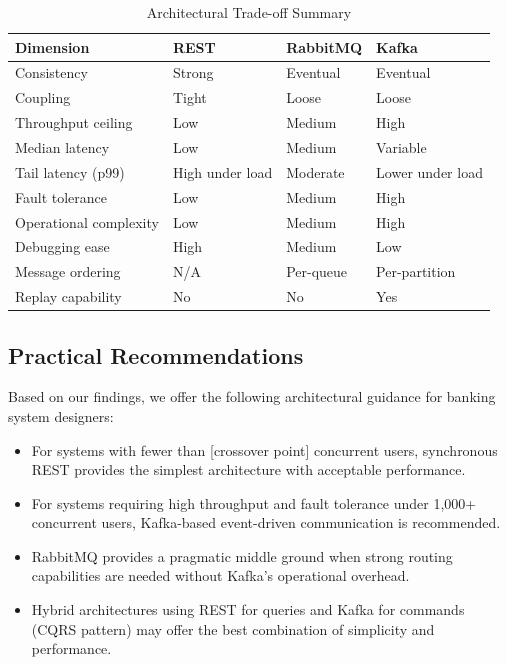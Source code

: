 \documentclass[journal]{IEEEtran}
\begin{document}
\begin{table}[!t]
\caption{Architectural Trade-off Summary}
\label{tab:tradeoffs}
\centering
\scriptsize
\begin{tabularx}{\columnwidth}{lXXX}
\toprule
\textbf{Dimension} & \textbf{REST} & \textbf{RabbitMQ} & \textbf{Kafka} \\
\midrule
Consistency & Strong & Eventual & Eventual \\
Coupling & Tight & Loose & Loose \\
Throughput ceiling & Low & Medium & High \\
Median latency & Low & Medium & Variable \\
Tail latency (p99) & High under load & Moderate & Lower under load \\
Fault tolerance & Low & Medium & High \\
Operational complexity & Low & Medium & High \\
Debugging ease & High & Medium & Low \\
Message ordering & N/A & Per-queue & Per-partition \\
Replay capability & No & No & Yes \\
\bottomrule
\end{tabularx}
\end{table}

\subsection{Practical Recommendations}
\label{subsec:disc_recommendations}

Based on our findings, we offer the following architectural guidance for banking system designers:

\begin{itemize}
    \item For systems with fewer than [crossover point] concurrent users, synchronous REST provides the simplest architecture with acceptable performance.
    \item For systems requiring high throughput and fault tolerance under 1,000+ concurrent users, Kafka-based event-driven communication is recommended.
    \item RabbitMQ provides a pragmatic middle ground when strong routing capabilities are needed without Kafka's operational overhead.
    \item Hybrid architectures using REST for queries and Kafka for commands (CQRS pattern) may offer the best combination of simplicity and performance.
\end{itemize}
\end{document}
